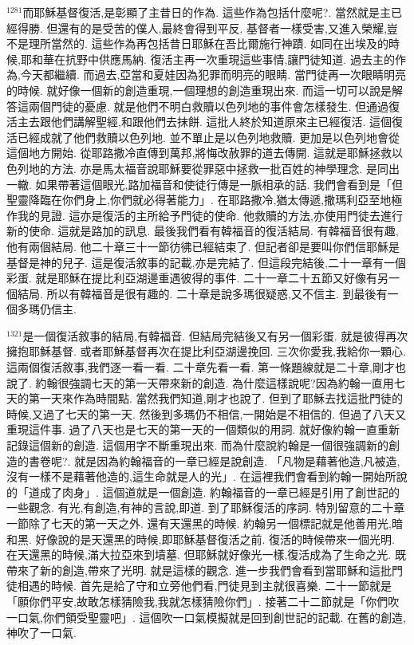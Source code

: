 \documentclass{book}
\begin{document}
$^{1281}$而耶穌基督復活,是彰顯了主昔日的作為.
這些作為包括什麼呢?.
當然就是主已經得勝.
但還有的是受苦的僕人,最終會得到平反.
基督者一樣受害,又進入榮耀,豈不是理所當然的.
這些作為再包括昔日耶穌在吾比爾施行神蹟.
如同在出埃及的時候,耶和華在抗野中供應馬納.
復活主再一次重現這些事情,讓門徒知道.
過去主的作為,今天都繼續.
而過去,亞當和夏娃因為犯罪而明亮的眼睛.
當門徒再一次眼睛明亮的時候.
就好像一個新的創造重現,一個理想的創造重現出來.
而這一切可以說是解答這兩個門徒的憂慮.
就是他們不明白救贖以色列地的事件會怎樣發生.
但通過復活主去跟他們講解聖經,和跟他們去抹餅.
這批人終於知道原來主已經復活.
這個復活已經成就了他們救贖以色列地.
並不單止是以色列地救贖.
更加是以色列地會從這個地方開始.
從耶路撒冷直傳到萬邦,將悔改赦罪的道去傳開.
這就是耶穌拯救以色列地的方法.
亦是馬太福音說耶穌要從罪惡中拯救一批百姓的神學理念.
是同出一轍.
如果帶著這個眼光,路加福音和使徒行傳是一脈相承的話.
我們會看到是「但聖靈降臨在你們身上,你們就必得著能力」.
在耶路撒冷,猶太傳遞,撒瑪利亞至地極作我的見證.
這亦是復活的主所給予門徒的使命.
他救贖的方法,亦使用門徒去進行新的使命.
這就是路加的訊息.
最後我們看有韓福音的復活結局.
有韓福音很有趣,他有兩個結局.
他二十章三十一節彷彿已經結束了.
但記者卻是要叫你們信耶穌是基督是神的兒子.
這是復活敘事的記載,亦是完結了.
但這段完結後,二十一章有一個彩蛋.
就是耶穌在提比利亞湖邊重遇彼得的事件.
二十一章二十五節又好像有另一個結局.
所以有韓福音是很有趣的.
二十章是說多瑪很疑惑,又不信主.
到最後有一個多瑪仍信主.

$^{1321}$是一個復活敘事的結局,有韓福音.
但結局完結後又有另一個彩蛋.
就是彼得再次擁抱耶穌基督.
或者耶穌基督再次在提比利亞湖邊挽回.
三次你愛我,我給你一顆心.
這兩個復活敘事,我們逐一看一看.
二十章先看一看.
第一條題線就是二十章,剛才也說了.
約翰很強調七天的第一天帶來新的創造.
為什麼這樣說呢?因為約翰一直用七天的第一天來作為時間點.
當然我們知道,剛才也說了.
但到了耶穌去找這批門徒的時候,又過了七天的第一天.
然後到多瑪仍不相信,一開始是不相信的.
但過了八天又重現這件事.
過了八天也是七天的第一天的一個類似的用詞.
就好像約翰一直重新記錄這個新的創造.
這個用字不斷重現出來.
而為什麼說約翰是一個很強調新的創造的書卷呢?.
就是因為約翰福音的一章已經是說創造.
「凡物是藉著他造,凡被造,沒有一樣不是藉著他造的,這生命就是人的光」.
在這裡我們會看到約翰一開始所說的「道成了肉身」.
這個道就是一個創造.
約翰福音的一章已經是引用了創世記的一些觀念.
有光,有創造,有神的言說,即道.
到了耶穌復活的序詞.
特別留意的二十章一節除了七天的第一天之外.
還有天還黑的時候.
約翰另一個標記就是他善用光,暗和黑.
好像說的是天還黑的時候,即耶穌基督復活之前.
復活的時候帶來一個光明.
在天還黑的時候,滿大拉亞來到墳墓.
但耶穌就好像光一樣,復活成為了生命之光.
既帶來了新的創造,帶來了光明.
就是這樣的觀念.
進一步我們會看到當耶穌和這批門徒相遇的時候.
首先是給了守和立旁他們看,門徒見到主就很喜樂.
二十一節就是「願你們平安,故敢怎樣猜險我,我就怎樣猜險你們」.
接著二十二節就是「你們吹一口氣,你們領受聖靈吧」.
這個吹一口氣模擬就是回到創世記的記載.
在舊的創造,神吹了一口氣.
\end{document}
